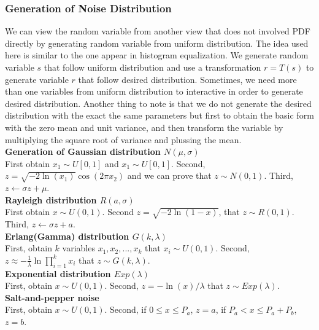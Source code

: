 \subsubsection{Generation of Noise Distribution}
We can view the random variable from another view that does not involved PDF directly by generating random variable from uniform distribution. The idea used here is similar to the one appear in histogram equalization. We generate random variable $s$ that follow uniform distribution and use a transformation $r=T(s)$ to generate variable $r$ that follow desired distribution. Sometimes, we need more than one variables from uniform distribution to interactive in order to generate desired distribution. Another thing to note is that we do not generate the desired distribution with the exact the same parameters but first to obtain the basic form with the zero mean and unit variance, and then transform the variable by multiplying the square root of variance and plussing the mean.\\
\textbf{Generation of Gaussian distribution $N(\mu, \sigma)$} \\
First obtain $x_1 \sim U[0,1]$ and $x_1 \sim U[0,1]$. Second, $z=\sqrt{-2\ln(x_1)}\cos(2\pi x_2)$ and we can prove that $z\sim N(0, 1)$. Third, $z \leftarrow \sigma z + \mu$. \\
\textbf{Rayleigh distribution $R(a, \sigma)$} \\
First obtain $x \sim U(0,1)$. Second $z=\sqrt{-2\ln(1-x)}$, that $z\sim R(0,1)$. Third, $z\leftarrow \sigma z+a$. \\
\textbf{Erlang(Gamma) distribution $G(k, \lambda)$} \\
First, obtain $k$ variables $x_1, x_2, ..., x_k$ that $x_i\sim U(0,1)$. Second, $z\approx -\frac{1}{\lambda}\ln\prod_{i=1}^k x_i$ that $z\sim G(k,\lambda)$. \\
\textbf{Exponential distribution $Exp(\lambda)$} \\
First, obtain $x\sim U(0,1)$. Second, $z=-\ln(x)/\lambda$ that $z\sim Exp(\lambda)$. \\ 
\textbf{Salt-and-pepper noise} \\
First, obtain $x\sim U(0,1)$. Second, if $0\leq x\leq P_a$, $z=a$, if $P_a<x\leq P_a+P_b$, $z=b$. \\

